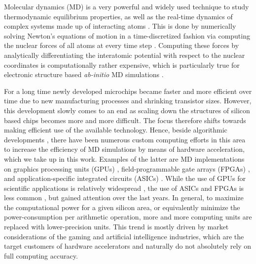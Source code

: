 \documentclass[format=acmsmall,urlbreakonhyphens]{acmart}
\begin{document}
Molecular dynamics (MD) is a very powerful and widely used technique to study thermodynamic equilibrium properties, as well as the real-time dynamics of complex systems made up of interacting atoms \cite{AlderWainwright1957}. This is done by numerically solving Newton's equations of motion in a time-discretized fashion via computing the nuclear forces of all atoms at every time step \cite{RahmanMD}. Computing these forces by analytically differentiating the interatomic potential with respect to the nuclear coordinates is computationally rather expensive, which is particularly true for electronic structure based \textit{ab-initio} MD simulations \cite{CPMD, CPMD_TDK, PayneRMP, WIRES_TDK}.

For a long time newly developed microchips became faster and more efficient over time due to new manufacturing processes and shrinking transistor sizes. However, this development slowly comes to an end as scaling down the structures of silicon based chips becomes more and more difficult. The focus therefore shifts towards making efficient use of the available technology. Hence, beside algorithmic developments \cite{MTS, Snir, GSE, Shaw, VerletCell, pSHAKE, John, Prodan}, there have been numerous custom computing efforts in this area to increase the efficiency of MD simulations by means of hardware acceleration, which we take up in this work. Examples of the latter are MD implementations on graphics processing units (GPUs) \cite{HOOMD, NAMD, OpenMM, HalMD, Lammps, Amber, Gromacs}, field-programmable gate arrays (FPGAs) \cite{HerbordtI, HerbordtII}, and application-specific integrated circuits (ASICs) \cite{AntonI, AntonII}.
While the use of GPUs for scientific applications is relatively widespread \cite{GPUcomp,Binder,Weigel}, the use of ASICs \cite{QCDScience, QCDOC, GrapeScience, Grape} and FPGAs is less common \cite{JanusI, JanusII, Convey, FDTD, Kenter, Galerkin}, but gained attention over the last years.
In general, to maximize the computational power for a given silicon area, or equivalently minimize the power-consumption per arithmetic operation, more and more computing units are replaced with lower-precision units. This trend is mostly driven by market considerations of the gaming and artificial intelligence industries, which are the target customers of hardware accelerators and naturally do not absolutely rely on full computing accuracy.
\end{document}

